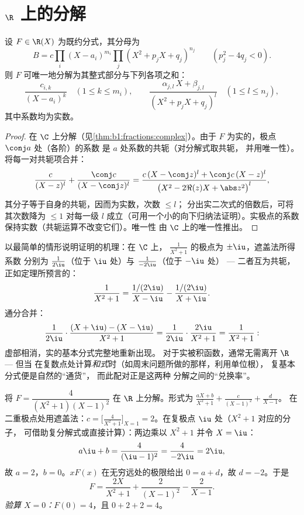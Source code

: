 \section{$\R$ 上的分解}

\begin{theorem}[$\R$ 上的分解]\label{thm:b1:fractions:real}
设 $F \in \R(X)$ 为既约分式，其分母为
\[
B = c \prod_i (X - a_i)^{m_i} \prod_j (X^2 + p_j X + q_j)^{n_j}
\qquad (p_j^2 - 4q_j < 0).
\]
则 $F$ 可唯一地分解为其整式部分与下列各项之和：
\[
\frac{c_{i,k}}{(X - a_i)^k} \quad (1 \leq k \leq m_i),
\qquad
\frac{\alpha_{j,l}\, X + \beta_{j,l}}{(X^2 + p_j X + q_j)^{l}}
\quad (1 \leq l \leq n_j),
\]
其中系数均为实数。
\end{theorem}

\begin{proof}
在 $\C$ 上分解（见\cref{thm:b1:fractions:complex}）。由于 $F$
为实的，极点 $\conj a$ 处（各阶）的系数
是 $a$ 处系数的共轭（对分解式取共轭，
并用唯一性）。将每一对共轭项合并：
\[
\frac{c}{(X - z)^l} + \frac{\conj c}{(X - \conj z)^l}
= \frac{c\,(X - \conj z)^l + \conj c\,(X - z)^l}{\bigl(X^2 - 2\Re(z)X
+ \abs z^2\bigr)^{l}},
\]
其分子等于自身的共轭，因而为实数，次数 $\leq l$；
分出实二次式的倍数后，可将其次数降为
$\leq 1$ 对每一级 $l$ 成立（可用一个小的向下归纳法证明）。实极点的系数
保持实数（共轭运算不改变它们）。唯一性
由 $\C$ 上的唯一性推出。
\end{proof}

\begin{example}[观察共轭配对]\label{ex:b1:fractions:pairing}
以最简单的情形说明证明的机理：在 $\C$ 上，
$\frac1{X^2+1}$ 的极点为 $\pm\iu$，遮盖法所得系数
分别为 $\frac1{2\iu}$（位于 $\iu$ 处）与 $\frac1{-2\iu}$（位于 $-\iu$ 处） ---
二者互为共轭，正如定理所预言的：
\[
\frac{1}{X^2 + 1}
= \frac{1/(2\iu)}{X - \iu} - \frac{1/(2\iu)}{X + \iu} .
\]
通分合并：
\[
\frac{1}{2\iu}\cdot\frac{(X + \iu) - (X - \iu)}{X^2 + 1}
= \frac{1}{2\iu}\cdot\frac{2\iu}{X^2 + 1} = \frac{1}{X^2+1} :
\]
虚部相消，实的基本分式完整地重新出现。
对于实被积函数，通常无需离开 $\R$ --- 但当
在复数点处计算\emph{和式}时（如周末问题所做的那样，利用单位根），
复基本分式便是自然的“通货”，
而此配对正是这两种
分解之间的“兑换率”。
\end{example}

\begin{example}\label{ex:b1:fractions:real}
将 $F = \dfrac{4}{(X^2+1)(X-1)^2}$ 在 $\R$ 上分解。形式为
$\frac{aX + b}{X^2 + 1} + \frac{c}{(X-1)^2} + \frac{d}{X - 1}$。
在二重极点处用遮盖法：$c = \bigl[\frac{4}{X^2+1}\bigr]_{X=1} =
2$。在复极点 $\iu$ 处（$X^2 + 1$ 对应的分子，
可借助复分解式或直接计算）：两边乘以
$X^2 + 1$ 并令 $X = \iu$：
\[
a\iu + b = \frac{4}{(\iu - 1)^2} = \frac{4}{-2\iu} = 2\iu ,
\]
故 $a = 2$，$b = 0$。$xF(x)$ 在无穷远处的极限给出 $0 = a + d$，故 $d
= -2$。于是
\[
F = \frac{2X}{X^2+1} + \frac{2}{(X-1)^2} - \frac{2}{X-1} .
\]
\emph{验算 $X = 0$：}$F(0) = 4$，且 $0 + 2 + 2 = 4$。
\end{example}

